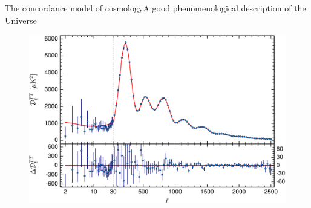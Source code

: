 \documentclass{beamer}
\begin{document}
\begin{frame}{The concordance model of cosmology}{A good phenomenological description of the Universe}
\begin{figure}[hbtp]
\centering
\includegraphics[width=\textwidth]{../figures/2015_TTSpectrum.png}
\end{figure}
\end{frame}
\end{document}
